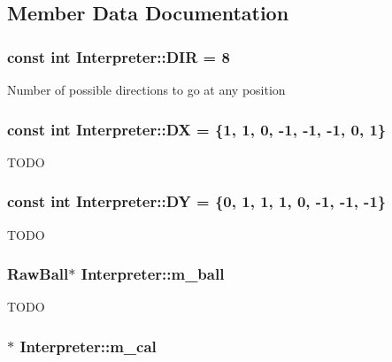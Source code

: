 \subsection{Member Data Documentation}
\hypertarget{classInterpreter_a13a73024c4a1e62845a91f686adcd919}{
\subsubsection[{DIR}]{\setlength{\rightskip}{0pt plus 5cm}const int {\bf Interpreter::DIR} = 8}}
\label{classInterpreter_a13a73024c4a1e62845a91f686adcd919}
Number of possible directions to go at any position \hypertarget{classInterpreter_ac3d8a1b37737331fbfe7f4cea33cbd04}{
\subsubsection[{DX}]{\setlength{\rightskip}{0pt plus 5cm}const int {\bf Interpreter::DX} = \{1, 1, 0, -\/1, -\/1, -\/1, 0, 1\}}}
\label{classInterpreter_ac3d8a1b37737331fbfe7f4cea33cbd04}
TODO \hypertarget{classInterpreter_aafc38675c9cad6e87686598dfe9c5758}{
\subsubsection[{DY}]{\setlength{\rightskip}{0pt plus 5cm}const int {\bf Interpreter::DY} = \{0, 1, 1, 1, 0, -\/1, -\/1, -\/1\}}}
\label{classInterpreter_aafc38675c9cad6e87686598dfe9c5758}
TODO \hypertarget{classInterpreter_abed4bfde044196ee1ed466bcc62efbd2}{
\subsubsection[{m\_\-ball}]{\setlength{\rightskip}{0pt plus 5cm}RawBall$\ast$ {\bf Interpreter::m\_\-ball}}}
\label{classInterpreter_abed4bfde044196ee1ed466bcc62efbd2}
TODO \hypertarget{classInterpreter_a734c73b13d471eb10d9a0ce772ffd906}{
\subsubsection[{m\_\-cal}]{$\ast$ {\bf Interpreter::m\_\-cal}}}
